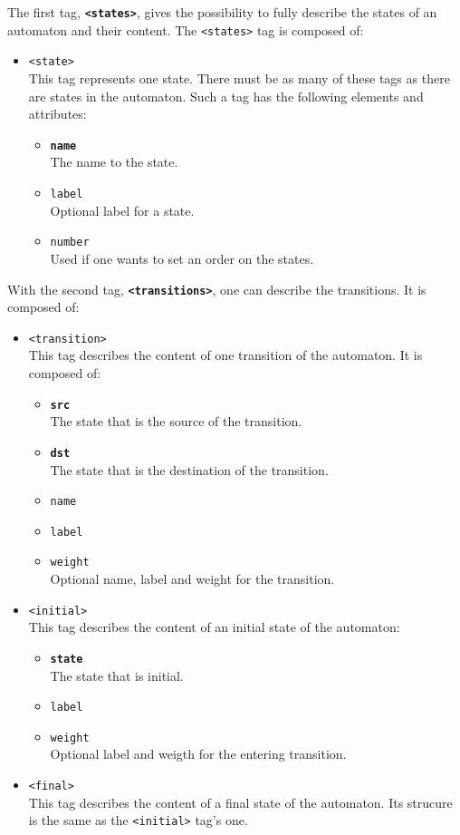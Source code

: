 \documentclass[a4paper]{article}
\def\statestag{\texttt{<states>}}
\def\statetag{\texttt{<state>}}
\def\transitionstag{\texttt{<transitions>}}
\def\transitiontag{\texttt{<transition>}}
\def\finaltag{\texttt{<final>}}
\def\initialtag{\texttt{<initial>}}
\begin{document}
The first tag, \textbf{\statestag{}}, gives the possibility to fully describe the states of an automaton
and their content. The \statestag{} tag is composed of:
\begin{itemize}
  \item \statetag{}\\
    This tag represents one state. There must be as many of these tags as there are states
in the automaton. Such a tag has the following elements and attributes:
\begin{itemize}
  \item \texttt{\textbf{name}}\\
    The name to the state.
  \item \texttt{label}\\
    Optional label for a state.
  \item \texttt{number}\\
    Used if one wants to set an order on the states.~\\
\end{itemize}
\end{itemize}

With the second tag, \textbf{\transitionstag{}}, one can describe the transitions. It is composed of:
\begin{itemize}
\item \transitiontag{}\\
  This tag describes the content of one transition of the automaton. It is
  composed of:
\begin{itemize}
  \item \texttt{\textbf{src}}\\
    The state that is the source of the transition.
  \item \texttt{\textbf{dst}}\\
    The state that is the destination of the transition.
  \item \texttt{name}
  \item \texttt{label}
  \item \texttt{weight}\\
    Optional name, label and weight for the transition.
\end{itemize}
\item \initialtag{}\\
  This tag describes the content of an initial state of the automaton:
\begin{itemize}
  \item \texttt{\textbf{state}}\\
    The state that is initial.
  \item \texttt{label}
  \item \texttt{weight}\\
    Optional label and weigth for the entering transition.
\end{itemize}
\item \finaltag{}\\
  This tag describes the content of a final state of the automaton. Its
strucure is the same as the \initialtag{} tag's one.
\end{itemize}
\end{document}
